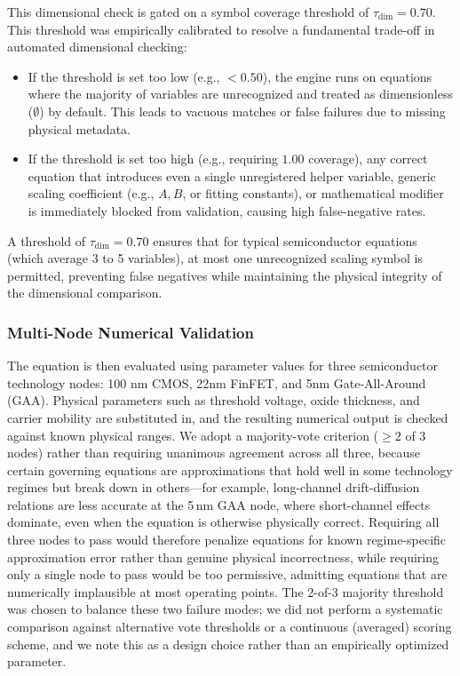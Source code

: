 \documentclass[a4paper,fleqn]{cas-sc}
\begin{document}
This dimensional check is gated on a symbol coverage threshold of $\tau_{\mathrm{dim}} = 0.70$. This threshold was empirically calibrated to resolve a fundamental trade-off in automated dimensional checking:
\begin{itemize}
    \item If the threshold is set too low (e.g., $<0.50$), the engine runs on equations where the majority of variables are unrecognized and treated as dimensionless ($\emptyset$) by default. This leads to vacuous matches or false failures due to missing physical metadata.
    \item If the threshold is set too high (e.g., requiring $1.00$ coverage), any correct equation that introduces even a single unregistered helper variable, generic scaling coefficient (e.g., $A, B$, or fitting constants), or mathematical modifier is immediately blocked from validation, causing high false-negative rates.
\end{itemize}
A threshold of $\tau_{\mathrm{dim}} = 0.70$ ensures that for typical semiconductor equations (which average 3 to 5 variables), at most one unrecognized scaling symbol is permitted, preventing false negatives while maintaining the physical integrity of the dimensional comparison.

\subsubsection{Multi-Node Numerical Validation}
The equation is then evaluated using parameter values for three semiconductor technology nodes: 100 nm CMOS, 22nm FinFET, and 5nm Gate-All-Around (GAA). Physical parameters such as threshold voltage, oxide thickness, and carrier mobility are substituted in, and the resulting numerical output is checked against known physical ranges. We adopt a majority-vote criterion ($\geq 2$ of 3 nodes) rather than requiring unanimous agreement across all three, because certain governing equations are approximations that hold well in some technology regimes but break down in others---for example, long-channel drift-diffusion relations are less accurate at the 5\,nm GAA node, where short-channel effects dominate, even when the equation is otherwise physically correct. Requiring all three nodes to pass would therefore penalize equations for known regime-specific approximation error rather than genuine physical incorrectness, while requiring only a single node to pass would be too permissive, admitting equations that are numerically implausible at most operating points. The 2-of-3 majority threshold was chosen to balance these two failure modes; we did not perform a systematic comparison against alternative vote thresholds or a continuous (averaged) scoring scheme, and we note this as a design choice rather than an empirically optimized parameter.
\end{document}
